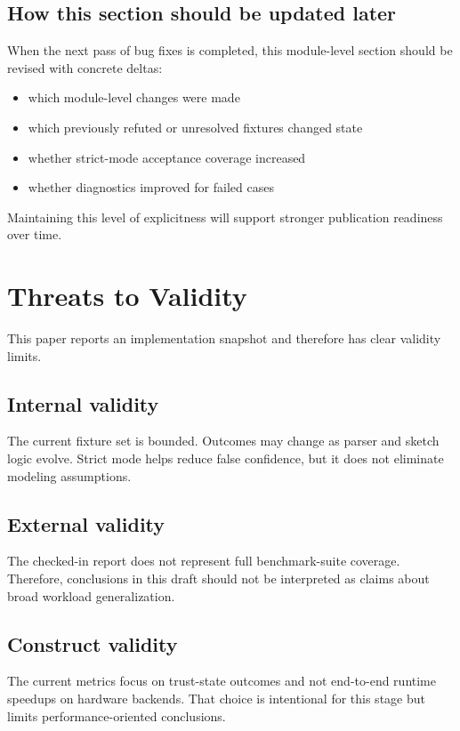 \documentclass[conference]{IEEEtran}
\begin{document}
\subsection{How this section should be updated later}
When the next pass of bug fixes is completed, this module-level section should be revised with concrete deltas:
\begin{itemize}
\item which module-level changes were made
\item which previously refuted or unresolved fixtures changed state
\item whether strict-mode acceptance coverage increased
\item whether diagnostics improved for failed cases
\end{itemize}
Maintaining this level of explicitness will support stronger publication readiness over time.

\section{Threats to Validity}
This paper reports an implementation snapshot and therefore has clear validity limits.

\subsection{Internal validity}
The current fixture set is bounded. Outcomes may change as parser and sketch logic evolve. Strict mode helps reduce false confidence, but it does not eliminate modeling assumptions.

\subsection{External validity}
The checked-in report does not represent full benchmark-suite coverage. Therefore, conclusions in this draft should not be interpreted as claims about broad workload generalization.

\subsection{Construct validity}
The current metrics focus on trust-state outcomes and not end-to-end runtime speedups on hardware backends. That choice is intentional for this stage but limits performance-oriented conclusions.
\end{document}
